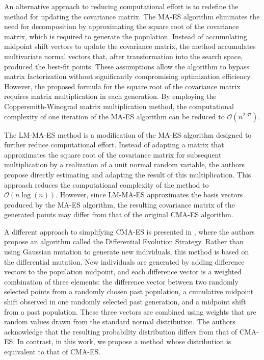 \documentclass[dvipsnames,format=sigconf,anonymous=false,review=false]{acmart}
\begin{document}
An alternative approach to reducing computational effort is to redefine the method for updating the covariance matrix. The MA-ES algorithm \cite{SMAES2017} eliminates the need for decomposition by approximating the square root of the covariance matrix, which is required to generate the population. Instead of accumulating midpoint shift vectors to update the covariance matrix, the method accumulates multivariate normal vectors that, after transformation into the search space, produced the best-fit points. These assumptions allow the algorithm to bypass matrix factorization without significantly compromising optimization efficiency. However, the proposed formula for the square root of the covariance matrix requires matrix multiplication in each generation. By employing the Coppersmith-Wino\-grad matrix multiplication method, the computational complexity of one iteration of the MA-ES algorithm can be reduced to $\mathcal{O}(n^{2.37})$.

The LM-MA-ES method \cite{Loshchilov3} is a modification of the MA-ES algorithm designed to further reduce computational effort. Instead of adapting a matrix that approximates the square root of the covariance matrix for subsequent multiplication by a realization of a unit normal random variable, the authors propose directly estimating and adapting the result of this multiplication. This approach reduces the computational complexity of the method to $\mathcal{O}(n \log(n))$. However, since LM-MA-ES approximates the basis vectors produced by the MA-ES algorithm, the resulting covariance matrix of the generated points may differ from that of the original CMA-ES algorithm.

A different approach to simplifying CMA-ES is presented in \cite{ArabasJ19}, where the authors propose an algorithm called the Differential Evolution Strategy. Rather than using Gaussian mutation to generate new individuals, this method is based on the differential mutation. New individuals are generated by adding difference vectors to the population midpoint, and each difference vector is a weighted combination of three elements: the difference vector between two randomly selected points from a randomly chosen past population, a cumulative midpoint shift observed in one randomly selected past generation, and a midpoint shift from a past population. These three vectors are combined using weights that are random values drawn from the standard normal distribution. The authors acknowledge that the resulting probability distribution differs from that of CMA-ES. In contrast, in this work, we propose a method whose distribution is equivalent to that of CMA-ES.
\end{document}
